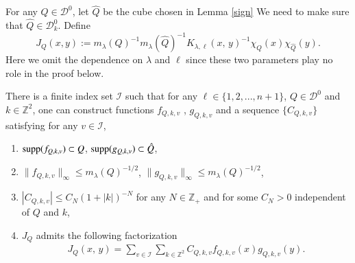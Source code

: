 \documentclass[12pt]{amsart}
\begin{document}
For any $Q\in\mathcal{D}^0$, {\color{red}let $\hat{Q}$ be the cube chosen in Lemma \ref{sign}} {\color{red}We need to make sure that $\hat{Q}\in\mathcal{D}_k^0$}. Define
$$J_{Q}(x,y):=m_\lambda(Q)^{-1}m_\lambda(\hat{Q})^{-1}K_{\lambda,\ell}(x,\,y)^{-1}\chi_Q(x)\chi_{\hat{Q}}(y).$$
Here we omit the dependence on $\lambda$ and $\ell$ since these two parameters play no role in the proof below.
\begin{lemma}\label{jq}
There is a finite index set $\mathcal{I}$ such that
for any $\ell\in\{1,2,...,n+1\}$, $Q\in\mathcal{D}^0$ and $k\in\mathbb{Z}^2$, one can construct  functions $f_{Q,k,v}$ , $g_{Q,k,v}$ and a sequence $\{C_{Q,k,v}\}$ satisfying for any $v\in\mathcal{I}$,
\begin{enumerate}
  \item ${\rm supp}(f_{Q,k,v})\subset Q$, ${\rm supp}(g_{Q,k,v})\subset \hat{Q}$,
  \item $\|f_{Q,k,v}\|_{\infty}\leq m_\lambda(Q)^{-1/2}$, $\|g_{Q,k,v}\|_{\infty}\leq m_\lambda(Q)^{-1/2}$,
  \item $|C_{Q,k,v}|\leq C_N(1+|k|)^{-N}$ for any $N\in\mathbb{Z}_+$ and for some $C_N>0$ independent of  $Q$ and $k$,
\item $J_{Q}$ admits the following factorization
\begin{align*}
J_{Q}(x,\,y)=\sum_{v\in\mathcal{I}}\sum_{k\in\mathbb{Z}^2}C_{Q,k,v}f_{Q,k,v}(x)g_{Q,k,v}(y).
\end{align*}
\end{enumerate}
\end{lemma}
\end{document}
